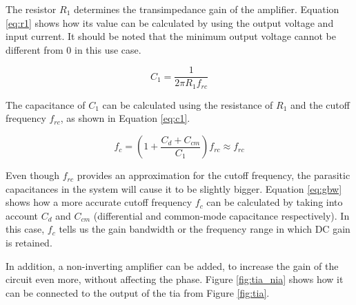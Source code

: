 The resistor $R_1$ determines the transimpedance gain of the amplifier. Equation \ref{eq:r1} shows how its value can be calculated by using the output voltage and input current. It should be noted that the minimum output voltage cannot be different from 0 in this use case.

\begin{equation}\label{eq:c1}
	C_1 = \frac{1}{2 \pi R_1 f_{rc}}
\end{equation}

The capacitance of $C_1$ can be calculated using the resistance of $R_1$ and the cutoff frequency $f_{rc}$, as shown in Equation \ref{eq:c1}. 

\begin{equation}\label{eq:gbw}
	f_{c} = (1 + \frac{C_d + C_{cm}}{C_1})f_{rc} \approx f_{rc}
\end{equation}

Even though $f_{rc}$ provides an approximation for the cutoff frequency, the parasitic capacitances in the system will cause it to be slightly bigger. Equation \ref{eq:gbw} shows how a more accurate cutoff frequency $f_c$ can be calculated by taking into account $C_d$ and $C_{cm}$ (differential and common-mode capacitance respectively). In this case, $f_c$ tells us the gain bandwidth or the frequency range in which DC gain is retained.

In addition, a non-inverting amplifier can be added, to increase the gain of the circuit even more, without affecting the phase. Figure \ref{fig:tia_nia} shows how it can be connected to the output of the \gls{tia} from Figure \ref{fig:tia}.

